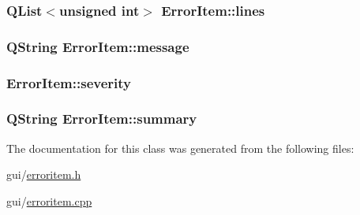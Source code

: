\hypertarget{class_error_item_aabd883de1cdd1cd394077ecdc67d171e}{
\subsubsection[{lines}]{\setlength{\rightskip}{0pt plus 5cm}Q\-List$<$unsigned int$>$ Error\-Item\-::lines}}\label{class_error_item_aabd883de1cdd1cd394077ecdc67d171e}
\hypertarget{class_error_item_ab549a8c75af7766413648798f0ae0383}{
\subsubsection[{message}]{\setlength{\rightskip}{0pt plus 5cm}Q\-String Error\-Item\-::message}}\label{class_error_item_ab549a8c75af7766413648798f0ae0383}
\hypertarget{class_error_item_aa5956cbcf0447d41e5d7db2ba1954e6f}{
\subsubsection[{severity}]{ Error\-Item\-::severity}}\label{class_error_item_aa5956cbcf0447d41e5d7db2ba1954e6f}
\hypertarget{class_error_item_a662817b060de330c8a038538ac25d946}{
\subsubsection[{summary}]{\setlength{\rightskip}{0pt plus 5cm}Q\-String Error\-Item\-::summary}}\label{class_error_item_a662817b060de330c8a038538ac25d946}


The documentation for this class was generated from the following files\-:\begin{DoxyCompactItemize}
\item 
gui/\hyperlink{erroritem_8h}{erroritem.\-h}\item 
gui/\hyperlink{erroritem_8cpp}{erroritem.\-cpp}\end{DoxyCompactItemize}
